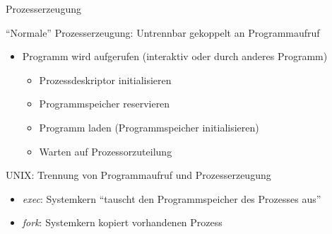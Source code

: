 \documentclass[utf8,9pt]{beamer}
\begin{document}
\begin{frame}{Prozesserzeugung}{}
  \begin{block}{"`Normale"' Prozesserzeugung: Untrennbar gekoppelt an
      Programmaufruf}
    \begin{itemize}
    \item Programm wird aufgerufen (interaktiv oder durch anderes
      Programm)
      \begin{itemize}
      \item Prozessdeskriptor initialisieren
      \item Programmspeicher reservieren
      \item Programm laden (Programmspeicher initialisieren)
      \item Warten auf Prozessorzuteilung
      \end{itemize}
    \end{itemize}
  \end{block}

  \begin{block}{UNIX: Trennung von Programmaufruf und
      Prozesserzeugung}
    \begin{itemize}
    \item {\em exec\/}: Systemkern "`tauscht den Programmspeicher des
      Prozesses aus"'
    \item {\em fork\/}: Systemkern kopiert vorhandenen Prozess
    \end{itemize}
  \end{block}
\end{frame}
\end{document}
